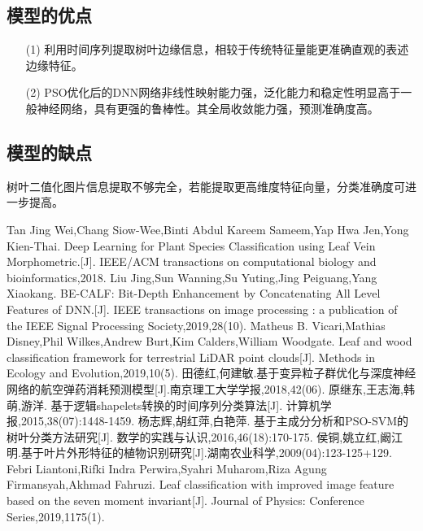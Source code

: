 \documentclass{whutmod}
\begin{document}
	\subsection{模型的优点}
		\begin{itemize}                                             
		\item [(1)] 利用时间序列提取树叶边缘信息，相较于传统特征量能更准确直观的表述边缘特征。
		\item [(2)] PSO优化后的DNN网络非线性映射能力强，泛化能力和稳定性明显高于一般神经网络，具有更强的鲁棒性。其全局收敛能力强，预测准确度高。
	
	\end{itemize}
	\subsection{模型的缺点}
	树叶二值化图片信息提取不够完全，若能提取更高维度特征向量，分类准确度可进一步提高。

    
	\newpage	%
	\nocite{*}		%
%
%	
\begin{thebibliography}{9}%
	 Tan Jing Wei,Chang Siow-Wee,Binti Abdul Kareem Sameem,Yap Hwa Jen,Yong Kien-Thai. Deep Learning for Plant Species Classification using Leaf Vein Morphometric.[J]. IEEE/ACM transactions on computational biology and bioinformatics,2018.
	Liu Jing,Sun Wanning,Su Yuting,Jing Peiguang,Yang Xiaokang. BE-CALF: Bit-Depth Enhancement by Concatenating All Level Features of DNN.[J]. IEEE transactions on image processing : a publication of the IEEE Signal Processing Society,2019,28(10).
	Matheus B. Vicari,Mathias Disney,Phil Wilkes,Andrew Burt,Kim Calders,William Woodgate. Leaf and wood classification framework for terrestrial LiDAR point clouds[J]. Methods in Ecology and Evolution,2019,10(5).
	田德红,何建敏.基于变异粒子群优化与深度神经网络的航空弹药消耗预测模型[J].南京理工大学学报,2018,42(06).
	原继东,王志海,韩萌,游洋. 基于逻辑shapelets转换的时间序列分类算法[J]. 计算机学报,2015,38(07):1448-1459.
	杨志辉,胡红萍,白艳萍. 基于主成分分析和PSO-SVM的树叶分类方法研究[J]. 数学的实践与认识,2016,46(18):170-175.
	侯铜,姚立红,阚江明.基于叶片外形特征的植物识别研究[J].湖南农业科学,2009(04):123-125+129.
	Febri Liantoni,Rifki Indra Perwira,Syahri Muharom,Riza Agung Firmansyah,Akhmad Fahruzi. Leaf classification with improved image feature based on the seven moment invariant[J]. Journal of Physics: Conference Series,2019,1175(1).
\end{thebibliography}
\end{document}

